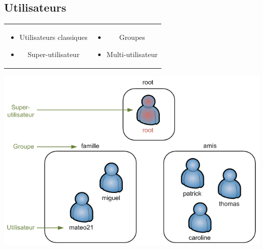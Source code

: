 \documentclass{beamer}
\begin{document}
\subsection{Utilisateurs}
\begin{frame}

\begin{tabular}{c c}
\begin{minipage}{0.5\linewidth}
\begin{itemize}
\item Utilisateurs classiques
\item Super-utilisateur
\end{itemize}
\end{minipage}
&
\begin{minipage}{0.5\linewidth}
\begin{itemize}
\item Groupes
\item Multi-utilisateur
\end{itemize}
\end{minipage}
\end{tabular}

\begin{center}
\includegraphics[width=0.8\linewidth]{images/su}
\end{center}

\end{frame}
\end{document}
